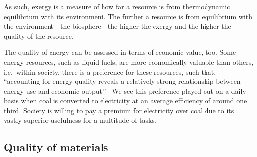 As such, exergy is a measure of how far a resource
is from thermodynamic equilibrium with its environment.
The further a resource is from equilibrium with the 
environment---the biosphere---the
higher the exergy and the higher the quality of the resource.

The quality of energy can be assessed in terms of economic value, too.
Some energy resources, such as liquid fuels, 
are more economically valuable than others,
i.e.\ within society, there is a preference for these resources,
such that, ``accounting for energy quality reveals a relatively strong relationship 
between energy use and economic output.''~\cite[p. 313]{Cleveland2000}
We see this preference played out on a daily basis
when coal is converted to electricity at 
an average efficiency of around one third.
Society is willing to pay a premium for electricity
over coal due to its vastly superior usefulness 
for a multitude of tasks.

\subsection{Quality of materials}
\label{sec:material_quality}


%
%

